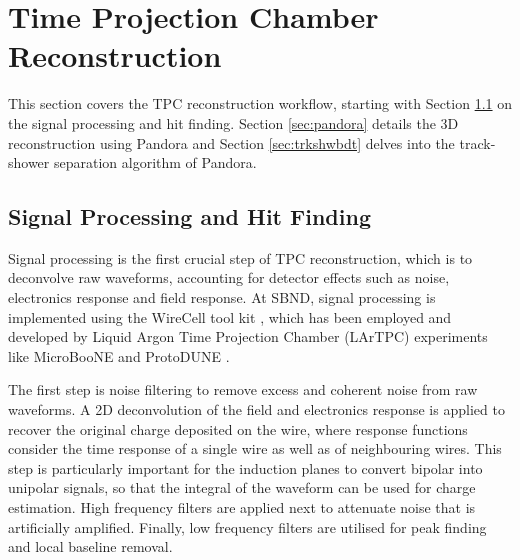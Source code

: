 \section{Time Projection Chamber Reconstruction}
\label{sec:reco_tpc}

This section covers the TPC reconstruction workflow, starting with Section \ref{sec:signal_process} on the signal processing and hit finding.
Section \ref{sec:pandora} details the 3D reconstruction using Pandora and Section \ref{sec:trkshwbdt} delves into the track-shower separation algorithm  of Pandora. 

\subsection{Signal Processing and Hit Finding}
\label{sec:signal_process}

Signal processing is the first crucial step of TPC reconstruction, which is to deconvolve raw waveforms, accounting for detector effects such as noise, electronics response and field response. 
At SBND, signal processing is implemented using the WireCell tool kit \cite{wirecell}, which has been employed and developed by Liquid Argon Time Projection Chamber (LArTPC) experiments like MicroBooNE \cite{wirecell} and ProtoDUNE \cite{wirecell_protodune}.

The first step is noise filtering to remove excess and coherent noise from raw waveforms.
A 2D deconvolution of the field and electronics response is applied to recover the original charge deposited on the wire, where response functions consider the time response of a single wire as well as of neighbouring wires.
This step is particularly important for the induction planes to convert bipolar into unipolar signals, so that the integral of the waveform can be used for charge estimation.
High frequency filters are applied next to attenuate noise that is artificially amplified.
Finally, low frequency filters are utilised for peak finding and local baseline removal.


